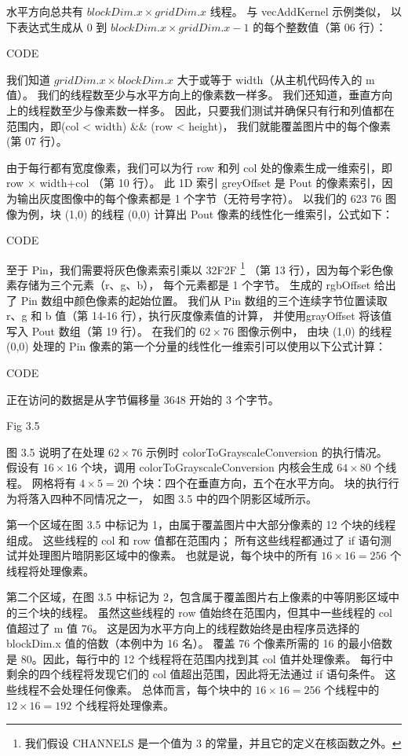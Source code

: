 水平方向总共有 $blockDim.x \times gridDim.x$ 线程。 与 vecAddKernel 示例类似，
以下表达式生成从 0 到 $blockDim.x \times gridDim.x - 1$ 的每个整数值（第 06 行）：

{\color{red} CODE}

我们知道 $gridDim.x \times blockDim.x$ 大于或等于 width（从主机代码传入的 m 值）。 
我们的线程数至少与水平方向上的像素数一样多。 我们还知道，垂直方向上的线程数至少与像素数一样多。 
因此，只要我们测试并确保只有行和列值都在范围内，即(col < width) \&\& (row < height)，
我们就能覆盖图片中的每个像素(第 07 行）。

由于每行都有宽度像素，我们可以为行 row 和列 col 处的像素生成一维索引，即 row × width+col （第 10 行）。 
此 1D 索引 greyOffset 是 Pout 的像素索引，因为输出灰度图像中的每个像素都是 1 个字节（无符号字符）。 
以我们的 623 76 图像为例，块 (1,0) 的线程 (0,0) 计算出 Pout 像素的线性化一维索引，公式如下：

{\color{red} CODE}

至于 Pin，我们需要将灰色像素索引乘以 32F2F
\footnote{我们假设 CHANNELS 是一个值为 3 的常量，并且它的定义在核函数之外。}
（第 13 行），因为每个彩色像素存储为三个元素（r、g、b），
每个元素都是 1 个字节。 生成的 rgbOffset 给出了 Pin 数组中颜色像素的起始位置。 
我们从 Pin 数组的三个连续字节位置读取 r、g 和 b 值（第 14-16 行），执行灰度像素值的计算，
并使用grayOffset 将该值写入 Pout 数组（第 19 行）。 在我们的 $62 \times 76$ 图像示例中，
由块 (1,0) 的线程 (0,0) 处理的 Pin 像素的第一个分量的线性化一维索引可以使用以下公式计算：

{\color{red} CODE}

正在访问的数据是从字节偏移量 3648 开始的 3 个字节。

{\color{red} Fig 3.5}

图 3.5 说明了在处理 $62 \times 76$ 示例时 colorToGrayscaleConversion 的执行情况。 
假设有 $16 \times 16$ 个块，调用 colorToGrayscaleConversion 内核会生成 $64 \times 80$ 个线程。 
网格将有 $4 \times 5 = 20$ 个块：四个在垂直方向，五个在水平方向。 块的执行行为将落入四种不同情况之一，
如图 3.5 中的四个阴影区域所示。

第一个区域在图 3.5 中标记为 1，由属于覆盖图片中大部分像素的 12 个块的线程组成。 这些线程的 col 和 row 值都在范围内； 
所有这些线程都通过了 if 语句测试并处理图片暗阴影区域中的像素。 
也就是说，每个块中的所有 $16 \times 16 = 256$ 个线程将处理像素。

第二个区域，在图 3.5 中标记为 2，包含属于覆盖图片右上像素的中等阴影区域中的三个块的线程。 
虽然这些线程的 row 值始终在范围内，但其中一些线程的 col 值超过了 m 值 76。
这是因为水平方向上的线程数始终是由程序员选择的 blockDim.x 值的倍数（本例中为 16 名）。 
覆盖 76 个像素所需的 16 的最小倍数是 80。因此，每行中的 12 个线程将在范围内找到其 col 值并处理像素。 
每行中剩余的四个线程将发现它们的 col 值超出范围，因此将无法通过 if 语句条件。 这些线程不会处理任何像素。 
总体而言，每个块中的 $16 \times 16 = 256$ 个线程中的 $12 \times 16 = 192$ 个线程将处理像素。


